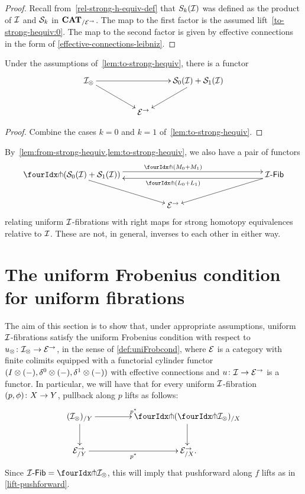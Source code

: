 \documentclass[reqno,10pt,a4paper,oneside,draft]{amsart}
\begin{document}
\begin{proof}
Recall from~\eqref{rel-strong-h-equiv-def} that $S_k(\cal{I})$ was defined as the product of $\cal{I}$ and $\cal{S}_k$ in $\CAT_{/\cal{E}^\to}$.
The map to the first factor is the assumed lift~\eqref{to-strong-hequiv:0}.
The map to the second factor is given by effective connections in the form of \cref{effective-connections-leibniz}.
\end{proof}


\begin{proposition} \label{thm:twodir}
Under the assumptions of~\cref{lem:to-strong-hequiv}, there is a functor 
\[
\xymatrix@!C@C-2.5em{
    \cal{I}_\otimes
  \ar[dr]
  \ar[rr]
&&
\cal{S}_0(\cal{I}) + \cal{S}_1(\cal{I})
  \ar[dl]
\\&
  \catE^\to
}
\]
\end{proposition} 

\begin{proof} Combine the cases $k = 0$ and $k = 1$ of~\cref{lem:to-strong-hequiv}.
\end{proof} 

\begin{remark} \label{relating-strong-hequiv-and-uniform-fib}
By~\cref{lem:from-strong-hequiv,lem:to-strong-hequiv},
we also have a pair of functors
\[
\xymatrix@!C@C-2.5em{
  \liftr{(\cal{S}_0(\cal{I}) + \cal{S}_1(\cal{I}))}
  \ar[dr]
  \ar@<4pt>[rr]^{\liftr{(M_0 + M_1)}}
&&
  \Fib{\cal{I}}
  \ar[dl]
  \ar@<4pt>[ll]^{\liftr{(L_0 + L_1)}}
\\&
  \catE^\to
}
\]
relating uniform $\cal{I}$-fibrations with right maps for strong homotopy equivalences relative to $\cal{I}$. These are not, in general, inverses to each other in either way.
\end{remark}


\section{The uniform Frobenius condition for uniform fibrations}
\label{sec:frocuf}

The aim of this section is to show that, under appropriate assumptions, uniform $\cal{I}$-fibrations satisfy the uniform Frobenius condition with respect to $u_\otimes \co \cal{I}_\otimes \to \cal{E}^\to$, in the sense of \cref{def:uniFrobcond}, where $\catE$ is a category with finite colimits equipped with a functorial cylinder functor $(\interval \otimes (-), \lcyl \otimes (-), \rcyl \otimes (-))$ with effective connections and  $u \co \cal{I} \to \catE^\to$ is a functor.
In particular, we will have that for every uniform $\cal{I}$-fibration $(p, \phi) \co X \to Y$, pullback along $p$ lifts as follows:
\[
\xymatrix@C+2em{
  (\cal{I}_\otimes)_{/Y}
  \ar[r]^{p^*}
  \ar[d]
&
  \liftl{(\liftr{\cal{I}_\otimes})}_{/X}
  \ar[d]
\\
  \cal{E}^\to_{/Y}
  \ar[r]_{p^*}
&
  \cal{E}^\to_{/X}
\rlap{.}}
\]
Since $\Fib{\cal{I}}  = \liftr{\cal{I}_\otimes}$, this will imply that pushforward along $f$ lifts as in \cref{lift-pushforward}.
\end{document}
